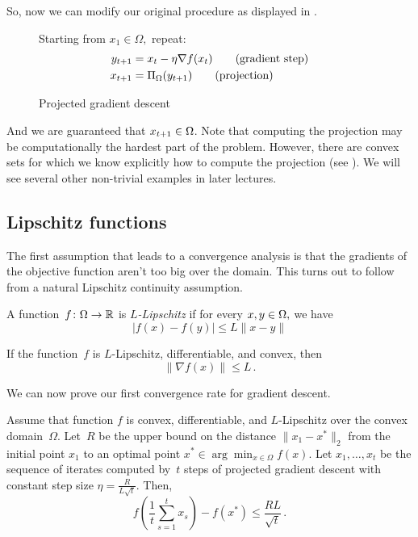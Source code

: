 So, now we can modify our original procedure as displayed in
.
\begin{figure}[h]
\begin{center}
\begin{boxedminipage}{0.85\textwidth}
Starting from $x_1\in\Omega,$ repeat:
\begin{align*}
y_{t+1} &= x_t - \eta \nabla f(x_t) \tag{gradient step} \\
x_{t+1} &= \Pi_{\Omega}(y_{t+1}) \tag{projection}
\end{align*}
\end{boxedminipage}
\end{center}
\caption{Projected gradient descent}
\end{figure}

And we are guaranteed that $x_{t+1}\in\Omega$. Note that computing the
projection may be computationally the hardest part of the problem.
However, there are convex sets for which we know explicitly how to
compute the projection (see ). We will see several
other non-trivial examples in later lectures.

\subsection{Lipschitz functions}

The first assumption that leads to a convergence analysis is that the gradients
of the objective function aren't too big over the domain. This turns out to
follow from a natural Lipschitz continuity assumption.

\begin{definition}[$L$-Lipschitz]
A function~$f\colon\Omega\to\mathbb{R}$ is \emph{$L$-Lipschitz} if for every
$x,y\in\Omega,$ we have
\[
|f(x) - f(y)| \leq L \|x - y\|
\]
\end{definition}

\begin{fact}
If the function~$f$ is $L$-Lipschitz, differentiable, and convex, then
\[
\|\nabla f(x)\| \leq L\,.
\]
\end{fact}

We can now prove our first convergence rate for gradient descent.

\begin{theorem}
Assume that function $f$ is convex, differentiable, 
and $L$-Lipschitz over the convex domain~$\Omega$. 
Let~$R$ be the upper bound on the distance $\lVert x_1 - x^* \rVert_2$
from the initial point $x_1$ to an optimal point $x^* \in\arg\min_{x \in \Omega} f(x)$.
Let $x_1,\dots,x_t$ be the sequence of iterates computed by~$t$ steps of
projected gradient descent with constant 
step size
$\eta=\frac{R}{L\sqrt{t}}.$
Then, 
\[
f\left(\frac{1}{t}\sum_{s=1}^t x_s\right) - f\left(x^*\right) 
\leq \frac{RL}{\sqrt{t}}\,.
\]
\end{theorem}

